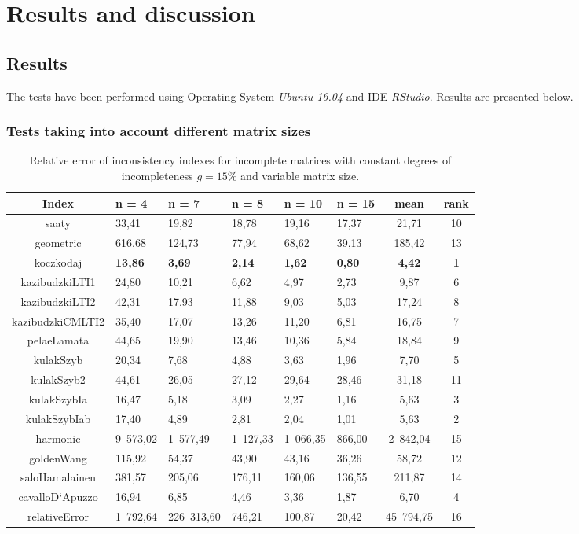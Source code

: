 \chapter{Results and discussion}
\label{sec:results}
\section{Results}
The tests have been performed using Operating System \textit{Ubuntu 16.04} and IDE \textit{RStudio}. Results are presented below.

\subsection{Tests taking into account different matrix sizes}
\begin{table}[h]
\begin{center}
\caption{Relative error of inconsistency indexes for incomplete matrices with constant degrees of incompleteness $g=15\%$ and variable matrix size.}
\label{tab:results1}
\begin{tabular}{|c||l|l|l|l|l|c||c|}
\hline Index & n = 4 & n = 7 & n = 8 & n = 10 & n = 15 & mean & rank \\ \hline \hline
saaty & 33,41 & 19,82 & 18,78 & 19,16 & 17,37 & 21,71 & 10 \\ \hline
geometric & 616,68 & 124,73 & 77,94 & 68,62 & 39,13 & 185,42 & 13 \\ \hline
koczkodaj & \textbf{13,86} & \textbf{3,69} & \textbf{2,14} & \textbf{1,62} & \textbf{0,80} & \textbf{4,42} & \textbf{1} \\ \hline
kazibudzkiLTI1 & 24,80 & 10,21 & 6,62 & 4,97 & 2,73 & 9,87 & 6 \\ \hline
kazibudzkiLTI2 & 42,31 & 17,93 & 11,88 & 9,03 & 5,03 & 17,24 & 8 \\ \hline
kazibudzkiCMLTI2 & 35,40 & 17,07 & 13,26 & 11,20 & 6,81 & 16,75 & 7 \\ \hline
pelaeLamata & 44,65 & 19,90 & 13,46 & 10,36 & 5,84 & 18,84 & 9 \\ \hline
kulakSzyb & 20,34 & 7,68 & 4,88 & 3,63 & 1,96 & 7,70 & 5 \\ \hline
kulakSzyb2 & 44,61 & 26,05 & 27,12 & 29,64 & 28,46 & 31,18 & 11 \\ \hline
kulakSzybIa & 16,47 & 5,18 & 3,09 & 2,27 & 1,16 & 5,63 & 3 \\ \hline
kulakSzybIab & 17,40 & 4,89 & 2,81 & 2,04 & 1,01 & 5,63 & 2 \\ \hline
harmonic & 9 573,02 & 1 577,49 & 1 127,33 & 1 066,35 & 866,00 & 2 842,04 & 15 \\ \hline
goldenWang & 115,92 & 54,37 & 43,90 & 43,16 & 36,26 & 58,72 & 12 \\ \hline
saloHamalainen & 381,57 & 205,06 & 176,11 & 160,06 & 136,55 & 211,87 & 14 \\ \hline
cavalloD`Apuzzo & 16,94 & 6,85 & 4,46 & 3,36 & 1,87 & 6,70 & 4 \\ \hline
relativeError & 1 792,64 & 226 313,60 & 746,21 & 100,87 & 20,42 & 45 794,75 & 16 \\ \hline
\end{tabular}
\end{center}
\end{table}


